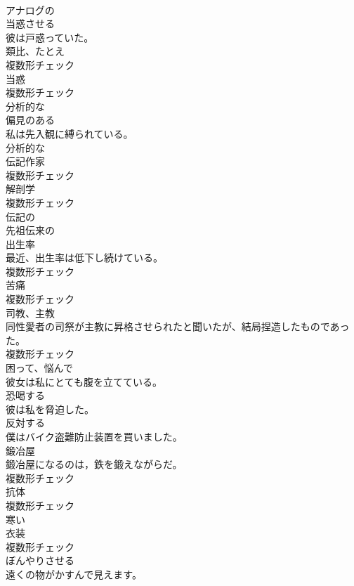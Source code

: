 \documentclass[8pt]{extreport}
\begin{document}
\begin{CJK}{UTF8}{min}
\\	[形容詞]	アナログの	
\\	[動詞]	当惑させる	
\\	彼は戸惑っていた。	
\\	[名詞]	類比、たとえ	
\\	複数形チェック
\\	[名詞]	当惑	
\\	複数形チェック
\\	[形容詞]	分析的な	
\\	[形容詞]	偏見のある	
\\	私は先入観に縛られている。	
\\	[形容詞]	分析的な	
\\	[名詞]	伝記作家	
\\	複数形チェック
\\	[名詞]	解剖学	
\\	複数形チェック
\\	[形容詞]	伝記の	
\\	[形容詞]	先祖伝来の	
\\	[名詞]	出生率	
\\	最近、出生率は低下し続けている。	
\\	複数形チェック
\\	[名詞]	苦痛	
\\	複数形チェック
\\	[名詞]	司教、主教	
\\	同性愛者の司祭が主教に昇格させられたと聞いたが、結局捏造したものであった。	
\\	複数形チェック
\\	[形容詞]	困って、悩んで	
\\	彼女は私にとても腹を立てている。	
\\	[動詞]	恐喝する	
\\	彼は私を脅迫した。	
\\	[形容詞]	反対する	
\\	僕はバイク盗難防止装置を買いました。	
\\	[名詞]	鍛冶屋	
\\	鍛冶屋になるのは，鉄を鍛えながらだ。	
\\	複数形チェック
\\	[名詞]	抗体	
\\	複数形チェック
\\	[形容詞]	寒い	
\\	[名詞]	衣装	
\\	複数形チェック
\\	[動詞]	ぼんやりさせる	
\\	遠くの物がかすんで見えます。	

\end{CJK}
\end{document}
